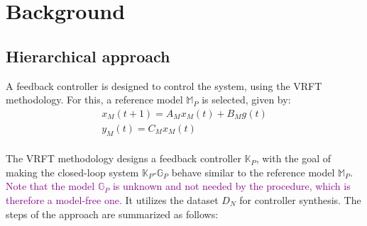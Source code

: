 \documentclass[letterpaper, 10 pt, conference]{ieeeconf}  %
\begin{document}
\section{Background}
\label{Background}
\subsection{Hierarchical approach}
A feedback controller is designed to control the system, using the VRFT methodology. For this, a reference model $\mathbb{M}_P$ is selected, given by:
	\begin{equation*}
	\begin{matrix}
	x_M(t+1) = A_Mx_M(t) + B_Mg(t)\\
	y_M(t) = C_Mx_M(t)
	\end{matrix}
	\end{equation*}\\  
 The VRFT methodology designs a feedback controller  $\mathbb{K}_P$, with the goal of making the closed-loop system $\mathbb{K}_P$-$\mathbb{G}_P$ behave similar to the reference model $\mathbb{M}_P$. \textcolor{purple}{Note that the model $\mathbb{G}_P$ is unknown and not needed by the procedure, which is therefore a model-free one.} It utilizes the dataset $D_N$ for controller synthesis. The steps of the approach are summarized as follows:
\end{document}

